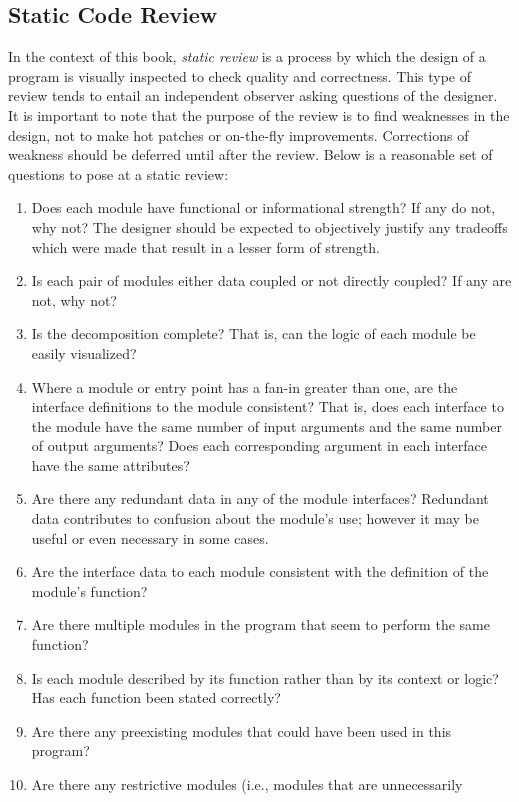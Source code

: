 \documentclass{designdoc}
\begin{document}
\subsection{Static Code Review}
In the context of this book, {\it static review} is a process by which the
design of a program is visually inspected to check quality and correctness.
This type of review tends to entail an independent observer asking questions of
the designer. It is important to note that the purpose of the review is to find
weaknesses in the design, not to make hot patches or on-the-fly improvements.
Corrections of weakness should be deferred until after the review. Below is a
reasonable set of questions to pose at a static review:

\begin{enumerate}
\item Does each module have functional or informational strength? If any do
  not, why not? The designer should be expected to objectively justify any
  tradeoffs which were made that result in a lesser form of strength.
\item Is each pair of modules either data coupled or not directly coupled? If
  any are not, why not?
\item Is the decomposition complete? That is, can the logic of each module be
  easily visualized?
\item Where a module or entry point has a fan-in greater than one, are the
  interface definitions to the module consistent? That is, does each interface
  to the module have the same number of input arguments and the same number of
  output arguments? Does each corresponding argument in each interface have the
  same attributes?
\item Are there any redundant data in any of the module interfaces? Redundant
  data contributes to confusion about the module's use; however it may be
  useful or even necessary in some cases.
\item Are the interface data to each module consistent with the definition of
  the module's function?
\item Are there multiple modules in the program that seem to perform the same
  function?
\item Is each module described by its function rather than by its context or
  logic? Has each function been stated correctly?
\item Are there any preexisting modules that could have been used in this
  program?
\item Are there any restrictive modules (i.e., modules that are unnecessarily

\end{enumerate}
\end{document}
